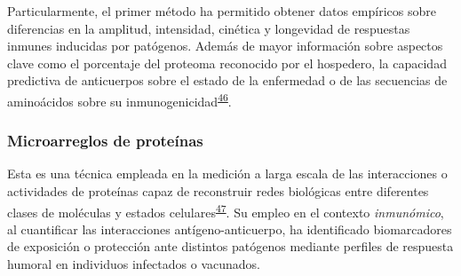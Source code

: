 \documentclass[a4paper]{article}
\begin{document}
\begin{enumerate}
\begin{enumerate}
    Particularmente, el primer método ha permitido obtener datos
    empíricos sobre diferencias en la amplitud, intensidad, cinética y
    longevidad de respuestas inmunes inducidas por patógenos. Además de
    mayor información sobre aspectos clave como el porcentaje del
    proteoma reconocido por el hospedero, la capacidad predictiva de
    anticuerpos sobre el estado de la enfermedad o de las secuencias de
    aminoácidos sobre su
    inmunogenicidad\textsuperscript{\protect\hyperlink{ref-Davies2015Large}{46}}.
  \end{enumerate}
\end{enumerate}

\subsubsection{Microarreglos de
proteínas}\label{microarreglos-de-proteinas}

Esta es una técnica empleada en la medición a larga escala de las
interacciones o actividades de proteínas capaz de reconstruir redes
biológicas entre diferentes clases de moléculas y estados
celulares\textsuperscript{\protect\hyperlink{ref-uzoma2013interactome}{47}}.
Su empleo en el contexto \emph{inmunómico}, al cuantificar las
interacciones antígeno-anticuerpo, ha identificado biomarcadores de
exposición o protección ante distintos patógenos mediante perfiles de
respuesta humoral en individuos infectados o vacunados.
\end{document}
